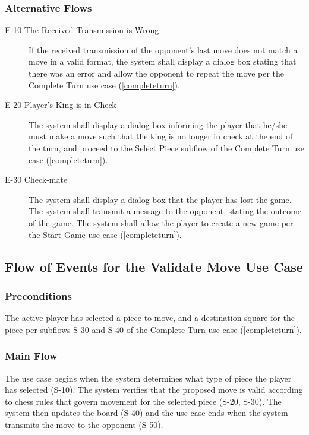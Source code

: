 \subsubsection{Alternative Flows}
\begin{description}
\item[E-10 The Received Transmission is Wrong] If the received transmission of the opponent's last move does not match a move in a valid format, the system shall display a dialog box stating that there was an error and allow the opponent to repeat the move per the Complete Turn use case (\ref{completeturn}). 
\item[E-20 Player's King is in Check] The system shall display a dialog box informing the player that he/she must make a move such that the king is no longer in check at the end of the turn, and proceed to the Select Piece subflow of the Complete Turn use case (\ref{completeturn}).
\item[E-30 Check-mate] The system shall display a dialog box that the player has lost the game.  The system shall transmit a message to the opponent, stating the outcome of the game.  The system shall allow the player to create a new game per the Start Game use case  (\ref{completeturn}). 
\end{description}


\subsection{Flow of Events for the Validate Move Use Case}
\label{valmove}
\subsubsection{Preconditions}
The active player has selected a piece to move, and a destination square for the piece per subflows S-30 and S-40 of the Complete Turn use case (\ref{completeturn}).
\subsubsection{Main Flow} 
The use case begins when the system determines what type of piece the player has selected (S-10).  The system verifies that the proposed move is valid according to chess rules that govern movement for the selected piece (S-20, S-30).  The system then updates the board (S-40) and the use case ends when the system transmits the move to the opponent (S-50). 
